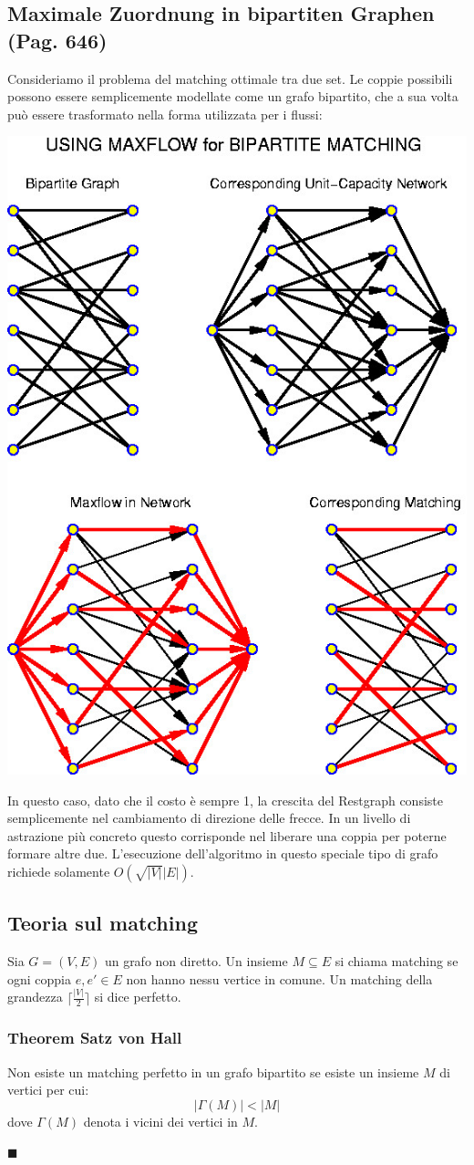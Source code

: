 \documentclass[a4paper]{book}
\newenvironment{mytheorem}[1]{\subsubsection*{Theorem #1}}{\begin{flushright}$\blacksquare$\end{flushright}}
\begin{document}
\subsection{Maximale Zuordnung in bipartiten Graphen (Pag. 646)}
Consideriamo il problema del matching ottimale tra due set. Le coppie possibili possono essere semplicemente modellate come un grafo bipartito, che a sua volta può essere trasformato nella forma utilizzata per i flussi:
\begin{center}
\includegraphics[scale=0.5]{Figures/matching.jpg}
\end{center}
In questo caso, dato che il costo è sempre 1, la crescita del Restgraph consiste semplicemente nel cambiamento di direzione delle frecce. In un livello di astrazione più concreto questo corrisponde nel liberare una coppia per poterne formare altre due. L'esecuzione dell'algoritmo in questo speciale tipo di grafo richiede solamente $O(\sqrt{|V|}|E|)$.
\subsection{Teoria sul matching}
Sia $G=(V,E)$ un grafo non diretto. Un insieme $M\subseteq E$ si chiama matching se ogni coppia $e,e' \in E$ non hanno nessu vertice in comune. Un matching della grandezza $\lceil \frac{|V|}{2} \rceil$ si dice perfetto.
\begin{mytheorem}{Satz von Hall}
Non esiste un matching perfetto in un grafo bipartito se esiste un insieme $M$ di vertici per cui:
$$|\Gamma (M)|<|M|$$
dove $\Gamma (M)$ denota i vicini dei vertici in $M$.
\end{mytheorem}
\end{document}
